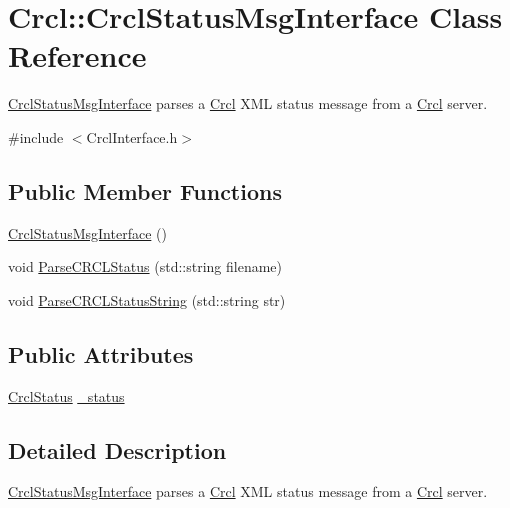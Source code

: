\hypertarget{classCrcl_1_1CrclStatusMsgInterface}{\section{Crcl\-:\-:Crcl\-Status\-Msg\-Interface Class Reference}
\label{classCrcl_1_1CrclStatusMsgInterface}
}


\hyperlink{classCrcl_1_1CrclStatusMsgInterface}{Crcl\-Status\-Msg\-Interface} parses a \hyperlink{namespaceCrcl}{Crcl} X\-M\-L status message from a \hyperlink{namespaceCrcl}{Crcl} server.  




{\ttfamily \#include $<$Crcl\-Interface.\-h$>$}

\subsection*{Public Member Functions}
\begin{DoxyCompactItemize}
\item 
\hyperlink{classCrcl_1_1CrclStatusMsgInterface_ab40fc183594b534628d4a41bcd80cdf1}{Crcl\-Status\-Msg\-Interface} ()
\item 
void \hyperlink{classCrcl_1_1CrclStatusMsgInterface_a4df5210ae7883b19d9a696c1023a86d7}{Parse\-C\-R\-C\-L\-Status} (std\-::string filename)
\item 
void \hyperlink{classCrcl_1_1CrclStatusMsgInterface_a7f58d655d492faf64e772ce273c188d1}{Parse\-C\-R\-C\-L\-Status\-String} (std\-::string str)
\end{DoxyCompactItemize}
\subsection*{Public Attributes}
\begin{DoxyCompactItemize}
\item 
\hyperlink{structCrcl_1_1CrclStatus}{Crcl\-Status} \hyperlink{classCrcl_1_1CrclStatusMsgInterface_a677faec62b56b6c1fdf40002a368a540}{\-\_\-status}
\end{DoxyCompactItemize}


\subsection{Detailed Description}
\hyperlink{classCrcl_1_1CrclStatusMsgInterface}{Crcl\-Status\-Msg\-Interface} parses a \hyperlink{namespaceCrcl}{Crcl} X\-M\-L status message from a \hyperlink{namespaceCrcl}{Crcl} server. 

